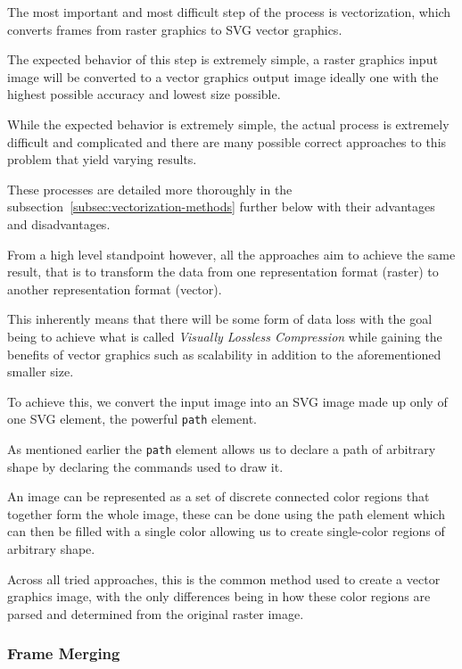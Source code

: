 \documentclass[12pt]{article}
\newcommand{\sentence}{} %
\newcommand{\italic}[1]{\textit{#1}}
\newcommand{\code}[1]{\texttt{#1}}
\renewcommand{\fullref}[1]{\ref{#1}\nameref{#1}}
\begin{document}
    \tab
    The most important and most difficult step of the process is vectorization, which converts
    frames from raster graphics to SVG vector graphics.
    \sentence
    The expected behavior of this step is extremely simple, a raster graphics input image will be converted to a
    vector graphics output image ideally one with the highest possible accuracy and lowest size possible.
    \sentence
    While the expected behavior is extremely simple, the actual process is extremely difficult and complicated and
    there are many possible correct approaches to this problem that yield varying results.
    \sentence
    These processes are detailed more thoroughly in the subsection~\fullref{subsec:vectorization-methods} further below
    with their advantages and disadvantages.
    \sentence
    From a high level standpoint however, all the approaches aim to achieve the same result, that is to transform the
    data from one representation format (raster) to another representation format (vector).
    \sentence
    This inherently means that there will be some form of data loss with the goal being to achieve what is called
    \italic{Visually Lossless Compression} while gaining the benefits of vector graphics such as scalability in
    addition to the aforementioned smaller size.
    \sentence
    To achieve this, we convert the input image into an SVG image made up only of one SVG element, the powerful
    \code{path} element.
    \sentence
    As mentioned earlier the \code{path} element allows us to declare a path of arbitrary shape by declaring the
    commands used to draw it.
    \sentence
    An image can be represented as a set of discrete connected color regions that together form the whole image,
    these can be done using the path element which can then be filled with a single color allowing us to create
    single-color regions of arbitrary shape.
    \sentence
    Across all tried approaches, this is the common method used to create a vector graphics image, with the only
    differences being in how these color regions are parsed and determined from the original raster image.


    \subsubsection{Frame Merging}\label{subsubsec:frame-merging}
\end{document}
